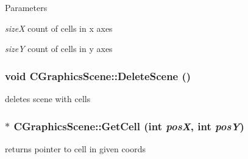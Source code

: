 \begin{DoxyParams}{Parameters}
\item[{\em sizeX}]count of cells in x axes \item[{\em sizeY}]count of cells in y axes \end{DoxyParams}
\hypertarget{classCGraphicsScene_ad718ef16c3756aaa66eacd4686e45202}{
\subsubsection[{DeleteScene}]{\setlength{\rightskip}{0pt plus 5cm}void CGraphicsScene::DeleteScene ()}}
\label{classCGraphicsScene_ad718ef16c3756aaa66eacd4686e45202}
deletes scene with cells \hypertarget{classCGraphicsScene_a29048e6dda1ce0082b8499b5d2e48910}{
\subsubsection[{GetCell}]{ $\ast$ CGraphicsScene::GetCell (int {\em posX}, \/  int {\em posY})}}
\label{classCGraphicsScene_a29048e6dda1ce0082b8499b5d2e48910}
returns pointer to cell in given coords


